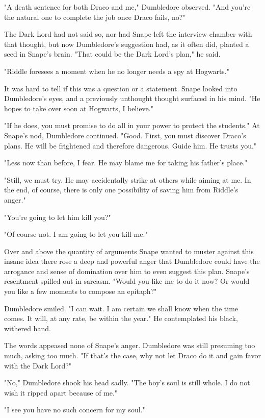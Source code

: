 "A death sentence for both Draco and me," Dumbledore observed. "And you're the natural one to complete the job once Draco fails, no?"

The Dark Lord had not said so, nor had Snape left the interview chamber with that thought, but now Dumbledore's suggestion had, as it often did, planted a seed in Snape's brain. "That could be the Dark Lord's plan," he said.

"Riddle foresees a moment when he no longer needs a spy at Hogwarts."

It was hard to tell if this was a question or a statement. Snape looked into Dumbledore's eyes, and a previously unthought thought surfaced in his mind. "He hopes to take over soon at Hogwarts, I believe."

"If he does, you must promise to do all in your power to protect the students." At Snape's nod, Dumbledore continued. "Good. First, you must discover Draco's plans. He will be frightened and therefore dangerous. Guide him. He trusts you."

"Less now than before, I fear. He may blame me for taking his father's place."

"Still, we must try. He may accidentally strike at others while aiming at me. In the end, of course, there is only one possibility of saving him from Riddle's anger."

"You're going to let him kill you?"

"Of course not. I am going to let you kill me."

Over and above the quantity of arguments Snape wanted to muster against this insane idea there rose a deep and powerful anger that Dumbledore could have the arrogance and sense of domination over him to even suggest this plan. Snape's resentment spilled out in sarcasm. "Would you like me to do it now? Or would you like a few moments to compose an epitaph?"

Dumbledore smiled. "I can wait. I am certain we shall know when the time comes. It will, at any rate, be within the year." He contemplated his black, withered hand.

The words appeased none of Snape's anger. Dumbledore was still presuming too much, asking too much. "If that's the case, why not let Draco do it and gain favor with the Dark Lord?"

"No," Dumbledore shook his head sadly. "The boy's soul is still whole. I do not wish it ripped apart because of me."

"I see you have no such concern for my soul."

